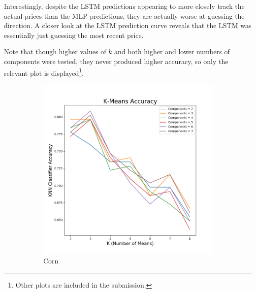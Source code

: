 \documentclass{article}
\begin{document}
Interestingly, despite the LSTM predictions appearing to more closely track the actual prices than the MLP predictions, they are actually worse at guessing the direction.  A closer look at the LSTM prediction curve reveals that the LSTM was essentially just guessing the most recent price.

Note that though higher values of $k$ and both higher and lower numbers of components were tested, they never produced higher accuracy, so only the relevant plot is displayed\footnote{Other plots are included in the submission.}.

\begin{figure}[H]
\centering
\begin{subfigure}{.5\textwidth}
  \centering
  \includegraphics[scale=.38]{images/cornacc2,7,w}
\caption{Corn}
\end{subfigure}%
\begin{subfigure}{.5\textwidth}
  \centering

\end{subfigure}
\end{figure}
\end{document}

